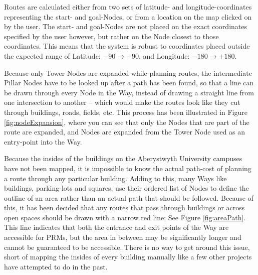 Routes are calculated either from two sets of latitude- and longitude-coordinates representing the start- and goal-Nodes, or from a location on the map clicked on by the user. The start- and goal-Nodes are not placed on the exact coordinates specified by the user however, but rather on the Node closest to those coordinates. This means that the system is robust to coordinates placed outside the expected range of Latitude: $-90 \to +90$, and Longitude: $-180 \to +180$\cite{WGS84,OSGB,OSM_Convert-WGS84}.

Because only Tower Nodes are expanded while planning routes, the intermediate Pillar Nodes have to be looked up after a path has been found, so that a line can be drawn through every Node in the Way, instead of drawing a straight line from one intersection to another -- which would make the routes look like they cut through buildings, roads, fields, etc. This process has been illustrated in Figure \ref{fig:nodeExpansion}, where you can see that only the Nodes that are part of the route are expanded, and Nodes are expanded from the Tower Node used as an entry-point into the Way.

Because the insides of the buildings on the Aberystwyth University campuses have not been mapped, it is impossible to know the actual path-cost of planning a route through any particular building. Adding to this, many Ways like buildings, parking-lots and squares, use their ordered list of Nodes to define the outline of an area rather than an actual path that should be followed. Because of this, it has been decided that any routes that pass through buildings or across open spaces should be drawn with a narrow red line; See Figure \ref{fig:areaPath}. This line indicates that both the entrance and exit points of the Way are accessible for PRMs, but the area in between may be significantly longer and cannot be guaranteed to be accessible. There is no way to get around this issue, short of mapping the insides of every building manually like a few other projects have attempted to do in the past\cite{osm_research-projects}.

